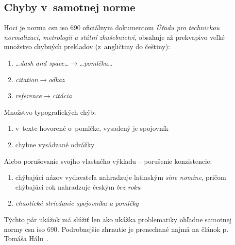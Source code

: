 \documentclass[
  color,
  table,
  nolof,
  oneside,
]{fithesis3}
\begin{document}
\subsection{Chyby v~samotnej norme}

Hoci je norma \gls{csn} \gls{iso} 690 oficiálnym dokumentom \emph{Úřadu pro technickou normalizaci, metrologii a státní zkušebnictví}, obsahuje až prekvapivo veľké množstvo chybných prekladov (z~angličtiny do češtiny):

\begin{enumerate}
\item \emph{\dots dash and space\dots}\qquad $\rightarrow$\qquad \emph{\dots pomlčka\dots}~\cite[\S\,9.3.6]{csn:iso690:2011}
\item \emph{citation}\qquad $\rightarrow$\qquad \emph{odkaz}\label{citation:odkaz}~\cite[\S\,2.2]{csn:iso690:2011}
\item \emph{reference}\qquad $\rightarrow$\qquad \emph{citácia}\label{reference:citacia}~\cite[\S\,2.15]{csn:iso690:2011}
\end{enumerate}

\noindent Množstvo typografických chýb:

\begin{enumerate}
\item v~texte hovorené o~pomlčke, vysadený je spojovník~\cite[\S\,9.3.6]{csn:iso690:2011}
\item chybne vysádzané odrážky~\cite[\S\,4.5]{csn:iso690:2011}
\end{enumerate}

\noindent Alebo porušovanie svojho vlastného výkladu -- porušenie konzistencie:

\begin{enumerate}
\item chýbajúci názov vydavateľa nahradzuje latinským \emph{sine nomine}, pričom chýbajúci rok nahradzuje českým \emph{bez roku}~\cite{Hala2013}
\item \emph{chaotické striedanie spojovníka a pomlčky}~\cite{Hala2013}
\end{enumerate}

\noindent Týchto pár ukážok má slúžiť len ako ukážka problematiky ohľadne samotnej normy \gls{csn} \gls{iso} 690. Podrobnejšie zhrnutie je prenechané najmä na článok p.\,Tomáša Hálu~\cite{Hala2013}.

\end{document}
